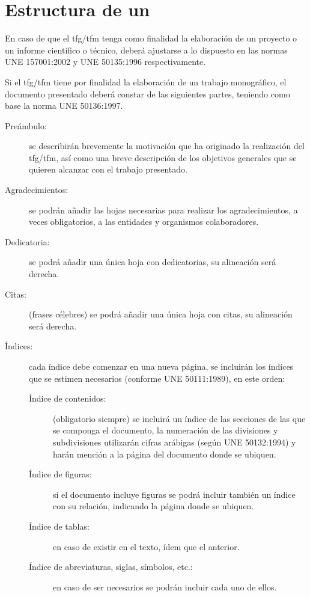 \section{Estructura de un }

En caso de que el \gls{tfg}/\gls{tfm} tenga como finalidad la elaboración de un proyecto o un 
informe científico o técnico, deberá ajustarse a lo dispuesto en las normas UNE 
157001:2002 y UNE 50135:1996 respectivamente.

Si el \gls{tfg}/\gls{tfm} tiene por finalidad la elaboración de un trabajo monográfico, el 
documento presentado deberá constar de las siguientes partes, teniendo como base la 
norma UNE 50136:1997.

\begin{description}
\item[Preámbulo:] se describirán brevemente la motivación que ha originado la realización del \gls{tfg}/\gls{tfm}, así como una breve descripción de los objetivos generales que se quieren alcanzar con el trabajo presentado.
\item[Agradecimientos:] se podrán añadir las hojas necesarias para realizar los agradecimientos, a veces obligatorios, a las entidades y organismos colaboradores.
\item[Dedicatoria:] se podrá añadir una única hoja con dedicatorias, su alineación será derecha.
\item[Citas:] (frases célebres) se podrá añadir una única hoja con citas, su alineación será derecha.
\item[Índices:] cada índice debe comenzar en una nueva página, se incluirán los índices que se estimen necesarios (conforme UNE 50111:1989), en este orden:
\begin{description}
\item[Índice de contenidos:] (obligatorio siempre) se incluirá un índice de las secciones de las que se componga el documento, la numeración de las 
divisiones y subdivisiones utilizarán cifras arábigas (según UNE 50132:1994) y harán mención a la página del documento donde se ubiquen.
\item[Índice de figuras:] si el documento incluye figuras se podrá incluir también un índice con su relación, indicando la página donde se ubiquen.
\item[Índice de tablas:] en caso de existir en el texto, ídem que el anterior.
\item[Índice de abreviaturas, siglas, símbolos, etc.:] en caso de ser necesarios se podrán incluir cada uno de ellos.

\end{description}
\end{description}
